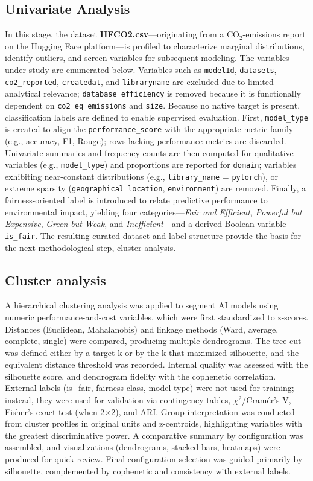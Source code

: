 \documentclass[journal]{IEEEtran}
\begin{document}
	\subsection{Univariate Analysis}
	In this stage, the dataset \textbf{HFCO2.csv}—originating from a $\text{CO}_2$-emissions report on the Hugging Face platform—is profiled to characterize marginal distributions, identify outliers, and screen variables for subsequent modeling. The variables under study are enumerated below. Variables such as \texttt{modelId}, \texttt{datasets}, \texttt{co2\_reported}, \texttt{createdat}, and \texttt{libraryname} are excluded due to limited analytical relevance; \texttt{database\_efficiency} is removed because it is functionally dependent on \texttt{co2\_eq\_emissions} and \texttt{size}.
	Because no native target is present, classification labels are defined to enable supervised evaluation. First, \texttt{model\_type} is created to align the \texttt{performance\_score} with the appropriate metric family (e.g., accuracy, F1, Rouge); rows lacking performance metrics are discarded. Univariate summaries and frequency counts are then computed for qualitative variables (e.g., \texttt{model\_type}) and proportions are reported for \texttt{domain}; variables exhibiting near-constant distributions (e.g., \texttt{library\_name} = \texttt{pytorch}), or extreme sparsity (\texttt{geographical\_location}, \texttt{environment}) are removed.
	Finally, a fairness-oriented label is introduced to relate predictive performance to environmental impact, yielding four categories—\emph{Fair and Efficient}, \emph{Powerful but Expensive}, \emph{Green but Weak}, and \emph{Inefficient}—and a derived Boolean variable \texttt{is\_fair}. The resulting curated dataset and label structure provide the basis for the next methodological step, cluster analysis.


	\subsection{Cluster analysis}
	\label{methodology:cluanal}
	A hierarchical clustering analysis was applied to segment AI models using numeric performance-and-cost variables, which were first standardized to z-scores.
	Distances (Euclidean, Mahalanobis) and linkage methods (Ward, average, complete, single) were compared, producing multiple dendrograms.
	The tree cut was defined either by a target k or by the k that maximized silhouette, and the equivalent distance threshold was recorded.
	Internal quality was assessed with the silhouette score, and dendrogram fidelity with the cophenetic correlation.
	External labels (is\_fair, fairness class, model type) were not used for training; instead, they were used for validation via contingency tables, $\chi$$^2$/Cramér’s V, Fisher’s exact test (when 2×2), and ARI.
	Group interpretation was conducted from cluster profiles in original units and z-centroids, highlighting variables with the greatest discriminative power.
	A comparative summary by configuration was assembled, and visualizations (dendrograms, stacked bars, heatmaps) were produced for quick review.
	Final configuration selection was guided primarily by silhouette, complemented by cophenetic and consistency with external labels.
\end{document}
